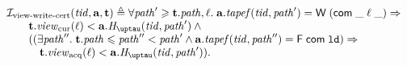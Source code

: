 \[\begin{array}{l}
\invViewWriteCERT(\tId, \aT, \tT) \triangleq
  \forall \cpath' \ge \tT.\cpath, \loc. \;
    \aT.\tapef(\tId, \cpath') = \tapeWrite{(\tapeWriteCommitted{\_}{\loc}{\_})} \Rightarrow \\
\qquad \tT.\Rcur(\loc) < \aT.\tmap(\tId, \cpath') \land {} \\
\qquad ((\exists \cpath''. \; \tT.\cpath \le \cpath'' < \cpath' \land 
             \aT.\tapef(\tId, \cpath'') = \tapeFence{\Committed}{\LD}) \Rightarrow \\
\qquad \quad \tT.\Racq(\loc) < \aT.\tmap(\tId, \cpath')).\\
\end{array}\]

